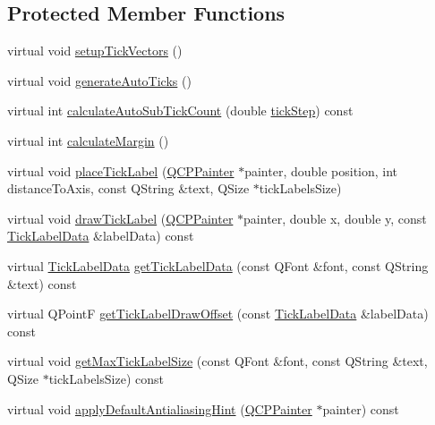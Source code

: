 \subsection*{Protected Member Functions}
\begin{DoxyCompactItemize}
\item 
virtual void \hyperlink{class_q_c_p_axis_a57d9e961bae7d62f5b4e1f143e660c78}{setup\-Tick\-Vectors} ()
\item 
virtual void \hyperlink{class_q_c_p_axis_a626eef437c874148df1a5ac78506d463}{generate\-Auto\-Ticks} ()
\item 
virtual int \hyperlink{class_q_c_p_axis_a3c5c045019fcdc0843a3e064eda7478a}{calculate\-Auto\-Sub\-Tick\-Count} (double \hyperlink{class_q_c_p_axis_a0e6120d24266544441ab691f316a1b03}{tick\-Step}) const 
\item 
virtual int \hyperlink{class_q_c_p_axis_a47bdb0a55de6759489ee47665199aebb}{calculate\-Margin} ()
\item 
virtual void \hyperlink{class_q_c_p_axis_a374e5a891b7ac3dc944e29f8d0d8c296}{place\-Tick\-Label} (\hyperlink{class_q_c_p_painter}{Q\-C\-P\-Painter} $\ast$painter, double position, int distance\-To\-Axis, const Q\-String \&text, Q\-Size $\ast$tick\-Labels\-Size)
\item 
virtual void \hyperlink{class_q_c_p_axis_ab7adf6d12ddb90d8f0b11e073d023065}{draw\-Tick\-Label} (\hyperlink{class_q_c_p_painter}{Q\-C\-P\-Painter} $\ast$painter, double x, double y, const \hyperlink{struct_q_c_p_axis_1_1_tick_label_data}{Tick\-Label\-Data} \&label\-Data) const 
\item 
virtual \hyperlink{struct_q_c_p_axis_1_1_tick_label_data}{Tick\-Label\-Data} \hyperlink{class_q_c_p_axis_a1fe23bcd7e074a3891fb89de07590a28}{get\-Tick\-Label\-Data} (const Q\-Font \&font, const Q\-String \&text) const 
\item 
virtual Q\-Point\-F \hyperlink{class_q_c_p_axis_a3344f814ff1d560f23c7d58fa4fb91f4}{get\-Tick\-Label\-Draw\-Offset} (const \hyperlink{struct_q_c_p_axis_1_1_tick_label_data}{Tick\-Label\-Data} \&label\-Data) const 
\item 
virtual void \hyperlink{class_q_c_p_axis_aca8025b82a43a4627eb87db9026a69c0}{get\-Max\-Tick\-Label\-Size} (const Q\-Font \&font, const Q\-String \&text, Q\-Size $\ast$tick\-Labels\-Size) const 
\item 
virtual void \hyperlink{class_q_c_p_axis_a13bde39eb1e0b7c14a02935689be8aba}{apply\-Default\-Antialiasing\-Hint} (\hyperlink{class_q_c_p_painter}{Q\-C\-P\-Painter} $\ast$painter) const 
\item 

\end{DoxyCompactItemize}
